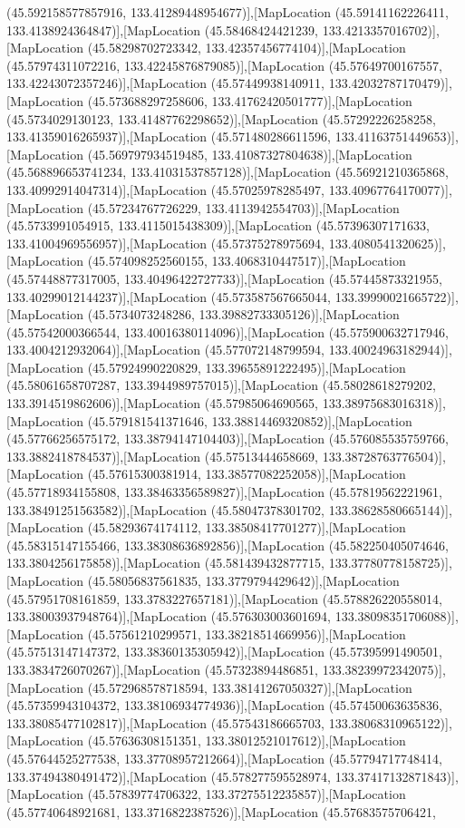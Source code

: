 (45.592158577857916, 133.41289448954677)],[MapLocation (45.59141162226411, 133.4138924364847)],[MapLocation (45.58468424421239, 133.4213357016702)],[MapLocation (45.58298702723342, 133.42357456774104)],[MapLocation (45.57974311072216, 133.42245876879085)],[MapLocation (45.57649700167557, 133.42243072357246)],[MapLocation (45.57449938140911, 133.42032787170479)],[MapLocation (45.573688297258606, 133.41762420501777)],[MapLocation (45.5734029130123, 133.41487762298652)],[MapLocation (45.57292226258258, 133.41359016265937)],[MapLocation (45.571480286611596, 133.41163751449653)],[MapLocation (45.569797934519485, 133.41087327804638)],[MapLocation (45.568896653741234, 133.41031537857128)],[MapLocation (45.56921210365868, 133.40992914047314)],[MapLocation (45.57025978285497, 133.40967764170077)],[MapLocation (45.57234767726229, 133.4113942554703)],[MapLocation (45.5733991054915, 133.4115015438309)],[MapLocation (45.57396307171633, 133.41004969556957)],[MapLocation (45.57375278975694, 133.4080541320625)],[MapLocation (45.574098252560155, 133.4068310447517)],[MapLocation (45.57448877317005, 133.40496422727733)],[MapLocation (45.57445873321955, 133.40299012144237)],[MapLocation (45.573587567665044, 133.39990021665722)],[MapLocation (45.5734073248286, 133.39882733305126)],[MapLocation (45.57542000366544, 133.40016380114096)],[MapLocation (45.575900632717946, 133.4004212932064)],[MapLocation (45.577072148799594, 133.40024963182944)],[MapLocation (45.57924990220829, 133.39655891222495)],[MapLocation (45.58061658707287, 133.3944989757015)],[MapLocation (45.58028618279202, 133.3914519862606)],[MapLocation (45.57985064690565, 133.38975683016318)],[MapLocation (45.579181541371646, 133.38814469320852)],[MapLocation (45.57766256575172, 133.38794147104403)],[MapLocation (45.576085535759766, 133.3882418784537)],[MapLocation (45.57513444658669, 133.38728763776504)],[MapLocation (45.57615300381914, 133.38577082252058)],[MapLocation (45.57718934155808, 133.38463356589827)],[MapLocation (45.57819562221961, 133.38491251563582)],[MapLocation (45.58047378301702, 133.38628580665144)],[MapLocation (45.58293674174112, 133.38508417701277)],[MapLocation (45.58315147155466, 133.38308636892856)],[MapLocation (45.582250405074646, 133.3804256175858)],[MapLocation (45.581439432877715, 133.37780778158725)],[MapLocation (45.58056837561835, 133.3779794429642)],[MapLocation (45.57951708161859, 133.3783227657181)],[MapLocation (45.578826220558014, 133.38003937948764)],[MapLocation (45.576303003601694, 133.38098351706088)],[MapLocation (45.57561210299571, 133.38218514669956)],[MapLocation (45.57513147147372, 133.38360135305942)],[MapLocation (45.57395991490501, 133.3834726070267)],[MapLocation (45.57323894486851, 133.38239972342075)],[MapLocation (45.572968578718594, 133.38141267050327)],[MapLocation (45.57359943104372, 133.38106934774936)],[MapLocation (45.57450063635836, 133.38085477102817)],[MapLocation (45.57543186665703, 133.38068310965122)],[MapLocation (45.57636308151351, 133.38012521017612)],[MapLocation (45.57644525277538, 133.37708957212664)],[MapLocation (45.57794717748414, 133.37494380491472)],[MapLocation (45.578277595528974, 133.37417132871843)],[MapLocation (45.57839774706322, 133.37275512235857)],[MapLocation (45.57740648921681, 133.3716822387526)],[MapLocation (45.57683575706421, 